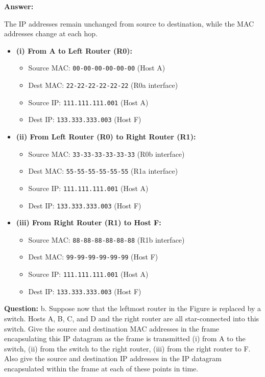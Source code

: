 \documentclass[12pt, letterpaper]{article}
\newcommand{\question}[1]{\noindent\textbf{Question: }#1\par\vspace{0.5em}}
\newcommand{\answer}{\noindent\textbf{Answer:}\par\vspace{0.5em}}
\begin{document}
\answer
The IP addresses remain unchanged from source to destination, while the MAC addresses change at each hop.
\begin{itemize}
    \item \textbf{(i) From A to Left Router (R0):}
    \begin{itemize}
        \item Source MAC: \texttt{00-00-00-00-00-00} (Host A)
        \item Dest MAC: \texttt{22-22-22-22-22-22} (R0a interface)
        \item Source IP: \texttt{111.111.111.001} (Host A)
        \item Dest IP: \texttt{133.333.333.003} (Host F)
    \end{itemize}
    \item \textbf{(ii) From Left Router (R0) to Right Router (R1):}
    \begin{itemize}
        \item Source MAC: \texttt{33-33-33-33-33-33} (R0b interface)
        \item Dest MAC: \texttt{55-55-55-55-55-55} (R1a interface)
        \item Source IP: \texttt{111.111.111.001} (Host A)
        \item Dest IP: \texttt{133.333.333.003} (Host F)
    \end{itemize}
    \item \textbf{(iii) From Right Router (R1) to Host F:}
    \begin{itemize}
        \item Source MAC: \texttt{88-88-88-88-88-88} (R1b interface)
        \item Dest MAC: \texttt{99-99-99-99-99-99} (Host F)
        \item Source IP: \texttt{111.111.111.001} (Host A)
        \item Dest IP: \texttt{133.333.333.003} (Host F)
    \end{itemize}
\end{itemize}

\question{b. Suppose now that the leftmost router in the Figure is replaced by a switch. Hosts A, B, C, and D and the right router are all star-connected into this switch. Give the source and destination MAC addresses in the frame encapsulating this IP datagram as the frame is transmitted (i) from A to the switch, (ii) from the switch to the right router, (iii) from the right router to F. Also give the source and destination IP addresses in the IP datagram encapsulated within the frame at each of these points in time.}
\end{document}
